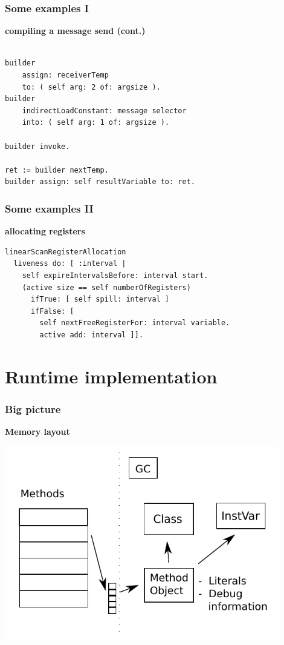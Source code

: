 \documentclass{beamer}
\begin{document}
\begin{frame}[fragile]
    \frametitle{Some examples I}
    {\bf compiling a message send (cont.)}
    \begin{lstlisting}
    
builder 
    assign: receiverTemp 
    to: ( self arg: 2 of: argsize ).
builder 
    indirectLoadConstant: message selector 
    into: ( self arg: 1 of: argsize ).
        
builder invoke.

ret := builder nextTemp.
builder assign: self resultVariable to: ret.

    \end{lstlisting}
\end{frame}

\begin{frame}[fragile]
    \frametitle{Some examples II}
    {\bf allocating registers}
    \begin{lstlisting}
linearScanRegisterAllocation
  liveness do: [ :interval |
    self expireIntervalsBefore: interval start.
    (active size == self numberOfRegisters)
      ifTrue: [ self spill: interval ]
      ifFalse: [ 
        self nextFreeRegisterFor: interval variable.  
        active add: interval ]].
    \end{lstlisting}
\end{frame}

\section{Runtime implementation}

\begin{frame}[fragile]
    \frametitle{Big picture}
    {\bf Memory layout }
    \begin{center}\includegraphics[width=0.9\textwidth]{memory.pdf}\end{center}
\end{frame}
\end{document}
